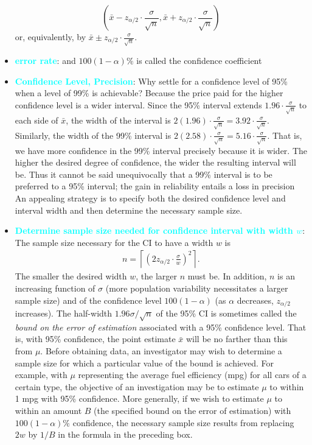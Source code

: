 \documentclass{report}
\begin{document}
\begin{itemize}
            \[
                \left( \bar{x} - z_{\alpha/2} \cdot \frac{\sigma}{\sqrt{n}}, \bar{x} + z_{\alpha/2} \cdot \frac{\sigma}{\sqrt{n}} \right)
            \]
            or, equivalently, by \(\bar{x} \pm z_{\alpha/2} \cdot \frac{\sigma}{\sqrt{n}}\).
        \item \textbf{\textcolor{cyan}{error rate}}: and $100(1-\alpha)\%$ is called the confidence coefficient
        \item \textbf{\textcolor{cyan}{Confidence Level, Precision}}: 
            Why settle for a confidence level of 95\% when a level of 99\% is achievable? Because the price paid for the higher confidence level is a wider interval. Since the 95\% interval extends $1.96 \cdot \frac{\sigma}{\sqrt{n}}$ to each side of $\bar{x}$, the width of the interval is $2(1.96) \cdot \frac{\sigma}{\sqrt{n}} = 3.92 \cdot \frac{\sigma}{\sqrt{n}}$. Similarly, the width of the 99\% interval is $2(2.58) \cdot \frac{\sigma}{\sqrt{n}} = 5.16 \cdot \frac{\sigma}{\sqrt{n}}$. That is, we have more confidence in the 99\% interval precisely because it is wider. The higher the desired degree of confidence, the wider the resulting interval will be.
            \bigbreak \noindent 
            Thus it cannot be said unequivocally that a 99\% interval is to be preferred to a 95\% interval; the gain in reliability entails a loss in precision
            \bigbreak \noindent 
            An appealing strategy is to specify both the desired confidence level and interval width and then determine the necessary sample size.
        \item \textbf{\textcolor{cyan}{Determine sample size needed for confidence interval with width $w$}}:
            The sample size necessary for the CI to have a width $w$ is
            \begin{align*}
                n = \left\lceil\left( 2z_{\alpha/2} \cdot \frac{\sigma}{w} \right)^2\right\rceil
            .\end{align*}
            \bigbreak \noindent 
            The smaller the desired width $w$, the larger $n$ must be. In addition, $n$ is an increasing function of $\sigma$ (more population variability necessitates a larger sample size) and of the confidence level $100(1 - \alpha)$ (as $\alpha$ decreases, $z_{\alpha/2}$ increases).
            \bigbreak \noindent 
            The half-width $1.96 \sigma / \sqrt{n}$ of the 95\% CI is sometimes called the \textit{bound on the error of estimation} associated with a 95\% confidence level. That is, with 95\% confidence, the point estimate $\bar{x}$ will be no farther than this from $\mu$. Before obtaining data, an investigator may wish to determine a sample size for which a particular value of the bound is achieved. For example, with $\mu$ representing the average fuel efficiency (mpg) for all cars of a certain type, the objective of an investigation may be to estimate $\mu$ to within 1 mpg with 95\% confidence. More generally, if we wish to estimate $\mu$ to within an amount $B$ (the specified bound on the error of estimation) with $100(1 - \alpha)\%$ confidence, the necessary sample size results from replacing $2w$ by $1/B$ in the formula in the preceding box.

\end{itemize}
\end{document}
